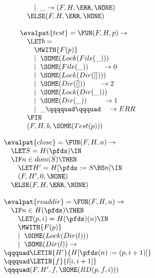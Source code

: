 \begin{figure*}
\begin{minipage}[t]{0.5\linewidth}
\begin{displaymath}
\begin{array}{l}
\qquad \mid~\_  \rightarrow (F,H,\ERR,\NONE) \\
\quad \ELSE (F,H,\ERR,\NONE) \\
\\
\evalpat{test} = \FUN (F,H,p) \rightarrow \\
\quad \LET b = \\
\qquad \MWITH{F(p)} \\
\qquad \mid~\SOME(Lock(File(\_))) \\
\qquad \mid~\SOME(File(\_)) \qquad \rightarrow 0 \\
\qquad \mid~\SOME(Lock(Dir([]))) \\
\qquad \mid~\SOME(Dir([])) \qquad \rightarrow 2 \\
\qquad \mid~\SOME(Lock(Dir(\_))) \\
\qquad \mid~\SOME(Dir(\_)) \qquad ~ \rightarrow 1 \\
\qquad  \mid~\_ \qqqquad \qqquad ~~~ \rightarrow ERR \\
\quad \FIN \\
\quad (F,H,b,\SOME(Test(p)))
\end{array}
\end{displaymath}
\end{minipage}
\hfill
\begin{minipage}[t]{0.5\linewidth}
\begin{displaymath}
\begin{array}{l}
\evalpat{close} = \FUN (F,H,n) \rightarrow \\
\quad \LET S = H(\pfds) \IN \\
\quad \IF n \in dom(S) \THEN \\
\qquad \LET H' = H[\pfds := S \BS n] \IN \\
\qquad (F,H',0,\NONE) \\
\quad \ELSE (F,H,\ERR,\NONE) \\
\\
\evalpat{readdir} = \FUN (F,H,n) \rightarrow \\
\quad \IF n \in H(\pfds) \THEN \\
\qquad \LET (p,i) = H(\pfds)(n) \IN \\
\qquad \MWITH{F(p)} \\
\qquad \mid~\SOME(Lock(Dir(l))) \\
\qquad \mid~\SOME(Dir(l)) \rightarrow \\
\qqquad \LETIN{H'}{H[\pfds(n) := (p,i+1)]} \\
\qqquad \LETIN{f}{l[i,i+1]} \\
\qqquad (F,H',f,\SOME(RD(p,f,i))) \\

\end{array}
\end{displaymath}
\end{minipage}
\end{figure*}
